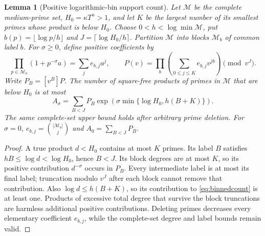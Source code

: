 \documentclass[11pt]{article}
\newtheorem{lemma}[theorem]{Lemma}
\begin{document}
\begin{lemma}[Positive logarithmic-bin support count]\label{lem:binnedcount}
Let $\mathcal M$ be the complete medium-prime set, $H_0=\kappa T^u>1$,
and let $K$ be the largest number of its smallest primes whose product
is below $H_0$. Choose $0<h<\log\min\mathcal M$, put
$b(p)=\lfloor\log p/h\rfloor$ and $J=\lceil\log H_0/h\rceil$.
Partition $\mathcal M$ into blocks $\mathcal M_b$ of common label $b$.
For $\sigma\ge0$, define positive coefficients by
\[
\prod_{p\in\mathcal M_b}(1+p^{-\sigma}a)=\sum_j e_{b,j}a^j,
\qquad
P(v)=\prod_b\left(\sum_{0\le j\le K}e_{b,j}v^{jb}\right)\pmod{v^J}.
\]
Write $P_B=[v^B]P$. The number of square-free products of primes in
$\mathcal M$ that are below $H_0$ is at most
\begin{equation}\label{eq:binnedcount}
A_\sigma=\sum_{B<J}P_B
 \exp\!\left(\sigma\min\{\log H_0,h(B+K)\}\right).
\end{equation}
The same complete-set upper bound holds after arbitrary prime deletion.
For $\sigma=0$, $e_{b,j}=\binom{|\mathcal M_b|}{j}$ and $A_0=\sum_{B<J}P_B$.
\end{lemma}
\begin{proof}
A true product $d<H_0$ contains at most $K$ primes. Its label $B$ satisfies
$hB\le\log d<\log H_0$, hence $B<J$. Its block degrees are at most $K$,
so its positive contribution $d^{-\sigma}$ occurs in $P_B$.
Every intermediate label is at most its final label; truncation modulo
$v^J$ after each block cannot remove that contribution. Also
$\log d\le h(B+K)$, so its contribution to \eqref{eq:binnedcount} is at
least one. Products of excessive total degree that survive the block
truncations are harmless additional positive contributions.
Deleting primes decreases every elementary coefficient $e_{b,j}$,
while the complete-set degree and label bounds remain valid.
\end{proof}
\end{document}
